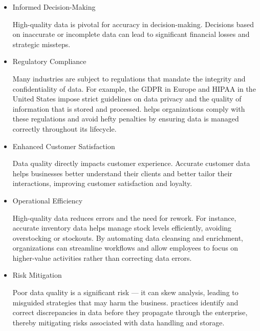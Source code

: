 \begin{itemize}
    \item Informed Decision-Making
    
    High-quality data is pivotal for accuracy in decision-making. Decisions based on inaccurate or incomplete data can lead to significant financial losses and strategic missteps.

    \item Regulatory Compliance
    
    Many industries are subject to regulations that mandate the integrity and confidentiality of data. For example, the GDPR in Europe and HIPAA in the United States impose strict guidelines on data privacy and the quality of information that is stored and processed.
         helps organizations comply with these regulations and avoid hefty penalties by ensuring data is managed correctly throughout its lifecycle.

    \item Enhanced Customer Satisfaction

    Data quality directly impacts customer experience. Accurate customer data helps businesses better understand their clients and better tailor their interactions, improving customer satisfaction and loyalty.

    \item Operational Efficiency
    
    High-quality data reduces errors and the need for rework. For instance, accurate inventory data helps manage stock levels efficiently, avoiding overstocking or stockouts.
    By automating data cleansing and enrichment, organizations can streamline workflows and allow employees to focus on higher-value activities rather than correcting data errors.    

    \item Risk Mitigation

    Poor data quality is a significant risk — it can skew analysis, leading to misguided strategies that may harm the business.
     practices identify and correct discrepancies in data before they propagate through the enterprise, thereby mitigating risks associated with data handling and storage.

\end{itemize}




